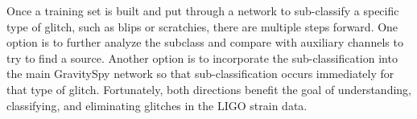 \documentclass[a4paper]{article}
\begin{document}
Once a training set is built and put through a network to sub-classify a specific type of glitch, such as blips or scratchies, there are multiple steps forward. One option is to further analyze the subclass and compare with auxiliary channels to try to find a source. Another option is to incorporate the sub-classification into the main GravitySpy network so that sub-classification occurs immediately for that type of glitch. Fortunately, both directions benefit the goal of understanding, classifying, and eliminating glitches in the LIGO strain data.




\end{document}
